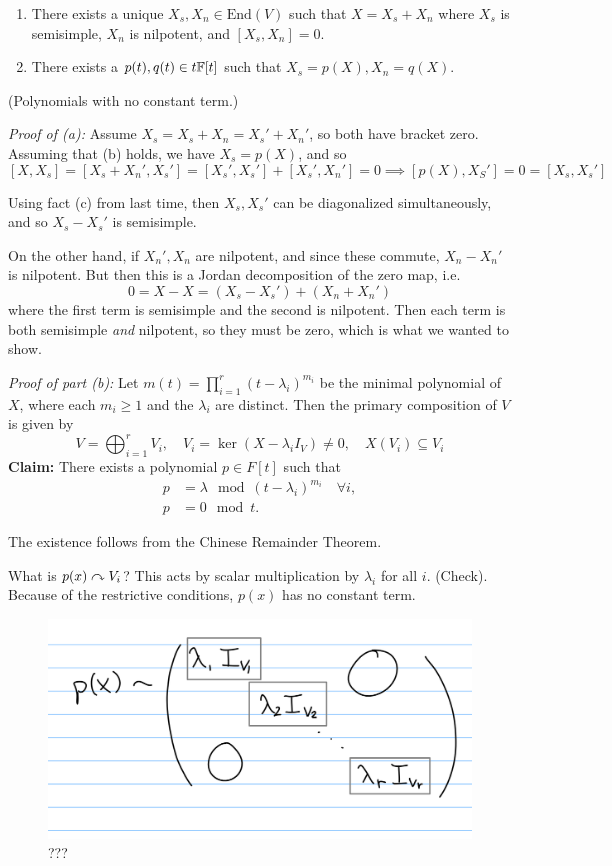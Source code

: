 \begin{enumerate}
\def\labelenumi{(\alph{enumi})}
\item
  There exists a unique \(X_s, X_n \in \mathrm{End}(V)\) such that
  \(X = X_s + X_n\) where \(X_s\) is semisimple, \(X_n\) is nilpotent,
  and \([X_s, X_n] = 0\).
\item
  There exists a \(p(t), q(t) \in t {\mathbb{F}}[t]\) such that
  \(X_s = p(X), X_n = q(X)\).
\end{enumerate}

(Polynomials with no constant term.)

\emph{Proof of (a):} Assume \(X_s = X_s + X_n = X_s' + X_n'\), so both
have bracket zero. Assuming that (b) holds, we have \(X_s = p(X)\), and
so \[
[X, X_s] = [X_s + X_n', X_s'] = [X_s', X_s'] + [X_s', X_n'] = 0 \implies
[p(X), X_S'] = 0 = [X_s, X_s']
\]

Using fact (c) from last time, then \(X_s, X_s'\) can be diagonalized
simultaneously, and so \(X_s - X_s'\) is semisimple.

On the other hand, if \(X_n', X_n\) are nilpotent, and since these
commute, \(X_n - X_n'\) is nilpotent. But then this is a Jordan
decomposition of the zero map, i.e. \[
0 = X - X = (X_s - X_s') + (X_n + X_n')
\] where the first term is semisimple and the second is nilpotent. Then
each term is both semisimple \emph{and} nilpotent, so they must be zero,
which is what we wanted to show.

\emph{Proof of part (b):} Let
\(m(t) = \prod_{i=1}^r (t-\lambda_i)^{m_i}\) be the minimal polynomial
of \(X\), where each \(m_i \geq 1\) and the \(\lambda_i\) are distinct.
Then the primary composition of \(V\) is given by \[
V = \bigoplus_{i=1}^r V_i,\quad V_i = \ker(X - \lambda_i I_V) \neq 0, \quad X(V_i) \subseteq V_i
\] \textbf{Claim:} There exists a polynomial \(p\in F[t]\) such that
\begin{align*}
p &= \lambda \mod (t-\lambda_i)^{m_i} \quad \forall i, \\
p &= 0 \mod t
.\end{align*}

The existence follows from the Chinese Remainder Theorem.

What is \(p(x) \curvearrowright V_i\)? This acts by scalar multiplication by
\(\lambda_i\) for all \(i\). (Check). Because of the restrictive
conditions, \(p(x)\) has no constant term.

\begin{figure}
\centering
\includegraphics{figures/2019-08-28-09:28.png}
\caption{???}
\end{figure}

